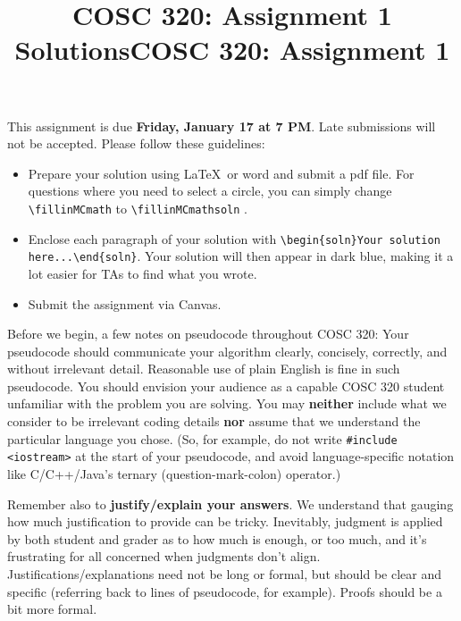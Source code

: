 \documentclass[11pt,fleqn]{exam}
\author{}
\date{}
\title{COSC 320: Assignment 1 Solutions}
\title{COSC 320: Assignment 1}
\newcommand{\fillinMCmath}[1]{\begin{tikzpicture}\draw circle [radius=0.5em];\end{tikzpicture}\ #1}
\newcommand{\fillinMCmathsoln}[1]{\begin{tikzpicture}\draw[black, fill=blue] circle [radius=0.5em];\end{tikzpicture}\ #1}
\newif\ifsolutions\solutionsfalse
\newenvironment{soln}{\color{solnblue}}{}
\begin{document}
	
	\maketitle

 \ifsolutions
 \setcounter{section}{1}
 \else
	\vspace{-0.5in} This assignment is due \textbf{Friday, January 17 at 7 PM}. Late submissions will not be accepted. Please follow these guidelines:
	\begin{itemize}
		\item Prepare your  solution using \LaTeX ~or word and submit  a pdf file. For questions where you  need to select a circle, you can simply
		change \verb~\fillinMCmath~ to \verb~\fillinMCmathsoln~ .
		
		\item Enclose each paragraph of your solution with
		\verb~\begin{soln}Your solution here...\end{soln}~.
		\begin{soln}Your  solution will  then appear  in dark  blue\end{soln}, making  it a  lot
		easier for TAs to find what you wrote.
		
		\item   Submit   the    assignment   via   Canvas.
		
	\end{itemize}
	
	Before we  begin, a few  notes on pseudocode throughout  COSC 320: Your  pseudocode should
	communicate your algorithm  clearly, concisely, correctly, and  without irrelevant detail.
	Reasonable use  of plain  English is  fine in  such pseudocode.  You should  envision your
	audience as a capable COSC 320 student unfamiliar with the problem you are solving. You may \textbf{neither} include what we consider to be irrelevant coding details \textbf{nor} assume that  we understand the particular  language you
	chose. (So, for example,  do not write \texttt{\#include <iostream>} at  the start of your
	pseudocode,   and    avoid   language-specific   notation   like    C/C++/Java's   ternary
	(question-mark-colon) operator.)
	
	Remember also  to \textbf{justify/explain  your answers}. We  understand that  gauging how
	much  justification to  provide can  be tricky.  Inevitably, judgment  is applied  by both
	student and  grader as to how  much is enough, or  too much, and it's  frustrating for all
	concerned  when judgments  don't align.  Justifications/explanations need  not be  long or
	formal, but  should be  clear and  specific (referring  back to  lines of  pseudocode, for
	example). Proofs should be a bit more formal.
	
\end{document}
